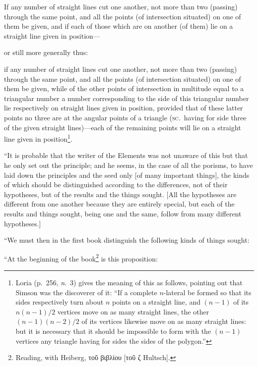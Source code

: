 \begin{proposition}
	If any number of straight lines cut one another, not more than two (passing) through the same point, and all the points (of intersection situated) on one of them be given, and if each of those which are on another (of them) lie on a straight line given in position---
\end{proposition}

\noindent
or still more generally thus:

\begin{proposition}
	\noindent
	if any number of straight lines cut one another, not more than two (passing) through the same point, and all the points (of intersection situated) on one of them be given, while of the other points of intersection in multitude equal to a triangular number a number corresponding to the side of this triangular number lie respectively on straight lines given in position, provided that of these latter points no three are at the angular points of a triangle (\textsc{sc.}~having for side three of the given straight lines)---each of the remaining points will lie on a straight line given in position\footnote{Loria (p.~256, \emph{n}.~3) gives the meaning of this as follows, pointing out that Simson was the discoverer of it: ``If a complete \(n\)-lateral be formed so that its sides respectively turn about \(n\) points on a straight line, and \((n-1)\) of its \(n(n-1)/2\) vertices move on as many straight lines, the other \((n-1)(n-2)/2\) of its vertices likewise move on as many straight lines: but it is necessary that it should be impossible to form with the \((n-1)\) vertices any triangle having for sides the sides of the polygon.''}.
\end{proposition}

``It is probable that the writer of the Elements was not unaware of this but that he only set out the principle; and he seems, in the case of all the porisms, to have laid down the principles and the seed only [of many important things], the kinds of which should be distinguished according to the differences, not of their hypotheses, but of the results and the things sought. [All the hypotheses are different from one another because they are entirely special, but each of the results and things sought, being one and the same, follow from many different hypotheses.]

``We must then in the first book distinguish the following kinds of things sought:

``At the beginning of the book\footnote{Reading, with Heiberg, τοῦ βιβλίου [τοῦ ζ Hultsch].} is this proposition:

